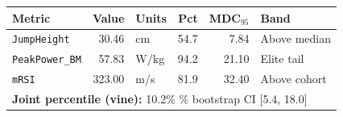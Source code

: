 \begin{tabular}{lrlrrl}
\toprule
Metric & Value & Units & Pct & MDC$_{95}$ & Band \\
\midrule
\texttt{JumpHeight} &  30.46 & cm & 54.7 &  7.84 & Above median \\
\texttt{PeakPower\_BM} &  57.83 & W/kg & 94.2 & 21.10 & Elite tail \\
\texttt{mRSI} & 323.00 & m/s & 81.9 & 32.40 & Above cohort \\
\midrule
\multicolumn{6}{l}{\textbf{Joint percentile (vine):} 10.2\% \quad 95\% bootstrap CI [5.4, 18.0]} \\
\bottomrule
\end{tabular}
